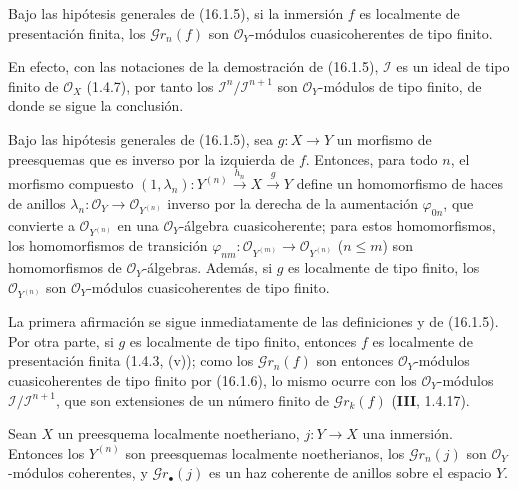 \begin{corollary}[16.1.6]
\label{IV.16.1.6}
Bajo las hipótesis generales de \textup{(16.1.5)}, si la inmersión $f$ es localmente de
presentación finita, los $\mathscr{G}r_n(f)$ son $\mathcal{O}_Y$-módulos
cuasicoherentes de tipo finito.
\end{corollary}

En efecto, con las notaciones de la demostración de (16.1.5), $\mathscr{I}$ es un
ideal de tipo finito de $\mathcal{O}_X$ (1.4.7), por tanto los
$\mathscr{I}^n/\mathscr{I}^{n+1}$ son $\mathcal{O}_Y$-módulos de tipo finito,
de donde se sigue la conclusión.

\begin{corollary}[16.1.7]
\label{IV.16.1.7}
Bajo las hipótesis generales de \textup{(16.1.5)}, sea $g:X\to Y$ un morfismo de
preesquemas que es inverso por la izquierda de $f$. Entonces, para todo $n$, el morfismo compuesto
$(1,\lambda_n):Y^{(n)}\xrightarrow{h_n}X\xrightarrow{g}Y$ define un
homomorfismo de haces de anillos
$\lambda_n:\mathcal{O}_Y\to\mathcal{O}_{Y^{(n)}}$ inverso por la derecha de
la aumentación $\varphi_{0n}$, que convierte a $\mathcal{O}_{Y^{(n)}}$ en una
$\mathcal{O}_Y$-álgebra cuasicoherente; para estos homomorfismos, los
homomorfismos de transición
$\varphi_{nm}:\mathcal{O}_{Y^{(m)}}\to\mathcal{O}_{Y^{(n)}}$ \textup{($n\leq m$)} son
homomorfismos de $\mathcal{O}_Y$-álgebras. Además, si $g$ es localmente
de tipo finito, los $\mathcal{O}_{Y^{(n)}}$ son $\mathcal{O}_Y$-módulos
cuasicoherentes de tipo finito.
\end{corollary}

La primera afirmación se sigue inmediatamente de las definiciones y de (16.1.5). Por otra
parte, si $g$ es localmente de tipo finito, entonces $f$ es localmente de
presentación finita (1.4.3, (v)); como los $\mathscr{G}r_n(f)$ son entonces
$\mathcal{O}_Y$-módulos cuasicoherentes de tipo finito por (16.1.6), lo mismo ocurre
con los $\mathcal{O}_Y$-módulos
$\mathscr{I}/\mathscr{I}^{n+1}$, que son extensiones de un número finito de
$\mathscr{G}r_k(f)$ (\textbf{III}, 1.4.17).

\begin{proposition}[16.1.8]
\label{IV.16.1.8}
Sean $X$ un preesquema localmente noetheriano, $j:Y\to X$ una inmersión. Entonces
los $Y^{(n)}$ son preesquemas localmente noetherianos, los
$\mathscr{G}r_n(j)$ son $\mathcal{O}_Y$-módulos coherentes, y
$\mathscr{G}r_\bullet(j)$ es un haz coherente de anillos sobre el espacio $Y$.
\end{proposition}

